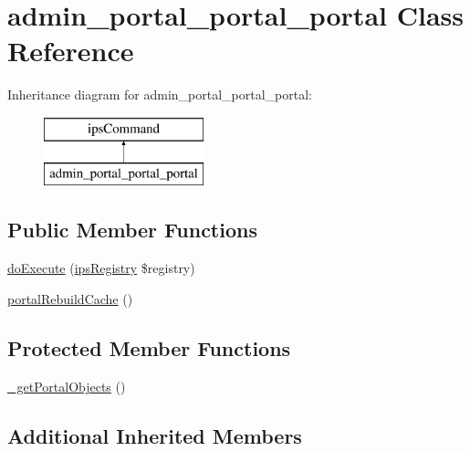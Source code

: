\hypertarget{classadmin__portal__portal__portal}{\section{admin\-\_\-portal\-\_\-portal\-\_\-portal Class Reference}
\label{classadmin__portal__portal__portal}
}
Inheritance diagram for admin\-\_\-portal\-\_\-portal\-\_\-portal\-:\begin{figure}[H]
\begin{center}
\leavevmode
\includegraphics[height=2.000000cm]{classadmin__portal__portal__portal}
\end{center}
\end{figure}
\subsection*{Public Member Functions}
\begin{DoxyCompactItemize}
\item 
\hyperlink{classadmin__portal__portal__portal_afbc4e912a0604b94d47d66744c64d8ba}{do\-Execute} (\hyperlink{classips_registry}{ips\-Registry} \$registry)
\item 
\hyperlink{classadmin__portal__portal__portal_a091e3b345328f4126b05e5588cdcc716}{portal\-Rebuild\-Cache} ()
\end{DoxyCompactItemize}
\subsection*{Protected Member Functions}
\begin{DoxyCompactItemize}
\item 
\hyperlink{classadmin__portal__portal__portal_adb950013488d9431f2b0446c9941b20c}{\-\_\-get\-Portal\-Objects} ()
\end{DoxyCompactItemize}
\subsection*{Additional Inherited Members}


